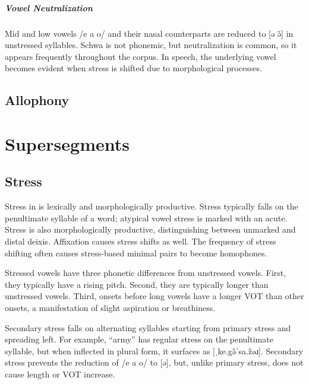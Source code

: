 \paragraph{Vowel Neutralization} 
Mid and low vowels /e a o/ and their nasal counterparts are reduced to [ə ə̃] in unstressed syllables.  Schwa is not phonemic, but neutralization is common, so it appears frequently throughout the corpus. In speech, the underlying vowel becomes evident when stress is shifted due to morphological processes.

\section{Allophony}

\setchapterpreamble[u]{\margintoc}
\chapter{Supersegments}
\section{Stress}
Stress in \langname{} is lexically and morphologically productive. Stress typically falls on the penultimate syllable of a word; atypical vowel stress is marked with an acute.  Stress is also morphologically productive, distinguishing between unmarked and distal deixis. Affixation causes stress shifts as well. The frequency of stress shifting often causes stress-based minimal pairs to become homophones.

Stressed vowels have three phonetic differences from unstressed vowels. First, they typically have a rising pitch. Second, they are typically longer than unstressed vowels. Third, onsets before long vowels have a longer VOT than other onsets, a manifestation of slight aspiration or breathiness.

Secondary stress falls on alternating syllables starting from primary stress and spreading left. For example,  “army” has regular stress on the penultimate syllable, but when inflected in plural form, it surfaces as  [ˌke.gə̃ˈsa.z̃əɹ]. Secondary stress prevents the reduction of /e a o/ to [ə], but, unlike primary stress, does not cause length or VOT increase.

